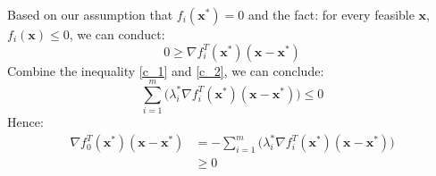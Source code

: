 \documentclass[10pt,a4paper]{article}
\begin{document}
Based on our assumption that $f_{i}(\mathbf{x}^{*}) = 0$ and the fact: for every feasible $\mathbf{x}$, $f_{i}(\mathbf{x}) \leq 0$, we can conduct:
\begin{equation}
	0 \geq \nabla f_{i}^{T}(\mathbf{x}^{*})(\mathbf{x} - \mathbf{x}^{*})
	\label{c_2}
\end{equation}
Combine the inequality \ref{c_1} and \ref{c_2}, we can conclude:
\begin{equation}
	\displaystyle\sum_{i = 1}^{m} \Big( \lambda_{i}^{*} \nabla f_{i}^{T}(\mathbf{x}^{*}) (\mathbf{x} - \mathbf{x}^{*}) \Big) \leq 0
\end{equation}
Hence:
\begin{equation}
	\begin{aligned}
		\nabla f_{0}^{T}(\mathbf{x}^{*}) (\mathbf{x} - \mathbf{x}^{*}) &= - \displaystyle\sum_{i = 1}^{m} \Big( \lambda_{i}^{*} \nabla f_{i}^{T}(\mathbf{x}^{*}) (\mathbf{x} - \mathbf{x}^{*}) \Big) \\
		&\geq 0
	\end{aligned}
\end{equation}
\end{document}
